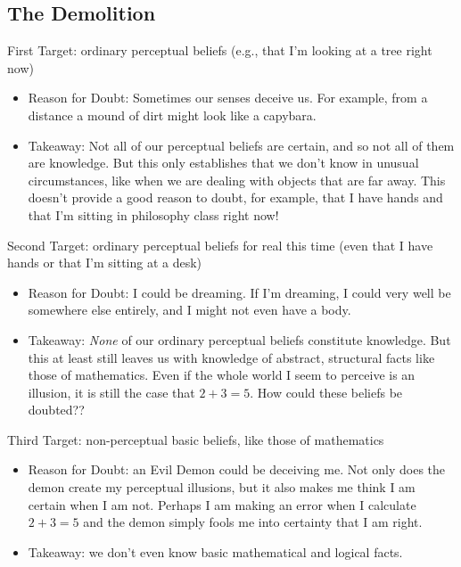 \documentclass[english, a4paper]{article}
\begin{document}
\subsection*{The Demolition}

First Target: ordinary perceptual beliefs (e.g., that I'm looking at a tree right now)

\begin{itemize}
	\item Reason for Doubt: Sometimes our senses deceive us. For example, from a distance a mound of dirt might look like a capybara.
	\item Takeaway: Not all of our perceptual beliefs are certain, and so not all of them are knowledge. But this only establishes that we don't know in unusual circumstances, like when we are dealing with objects that are far away. This doesn't provide a good reason to doubt, for example, that I have hands and that I'm sitting in philosophy class right now!
\end{itemize}

Second Target: ordinary perceptual beliefs for real this time (even that I have hands or that I'm sitting at a desk)

\begin{itemize}
	\item Reason for Doubt: I could be dreaming. If I'm dreaming, I could very well be somewhere else entirely, and I might not even have a body.
	\item Takeaway: \textit{None} of our ordinary perceptual beliefs constitute knowledge. But this at least still leaves us with knowledge of abstract, structural facts like those of mathematics. Even if the whole world I seem to perceive is an illusion, it is still the case that $2 + 3 = 5$. How could these beliefs be doubted??
\end{itemize}

Third Target: non-perceptual basic beliefs, like those of mathematics

\begin{itemize}
	\item Reason for Doubt: an Evil Demon could be deceiving me. Not only does the demon create my perceptual illusions, but it also makes me think I am certain when I am not. Perhaps I am making an error when I calculate $2 + 3 = 5$ and the demon simply fools me into certainty that I am right.
	\item Takeaway: we don't even know basic mathematical and logical facts.
\end{itemize}
\end{document}
